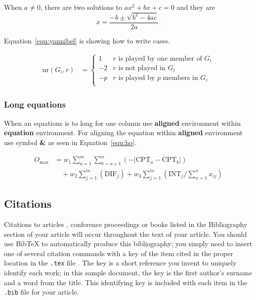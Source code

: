 \documentclass[article]{stucosrec}
\begin{document}
	When $a \ne 0$, there are two solutions to $ax^2 + bx + c = 0$ and they are $$x = \frac{-b \pm \sqrt{b^2-4ac}}{2a}.$$
	
	Equation~\ref{equ:yannibel} is showing how to write cases.
	
	\begin{equation}
		\begin{aligned} 
			\mathrm{nr}(G_i,r) & = \label{equ:yannibel}
			\begin{cases}
				1  & \text{$r$ is played by one member of $G_i$}\\
				-2 & \text{$r$ is not played in $G_i$} \\
				-p & \text{$r$ is played by $p$ members in $G_i$}\\
			\end{cases}
		\end{aligned}
	\end{equation}
	
	\subsubsection{Long equations}
	
	When an equations is to long for one column use \textbf{aligned} environment within \textbf{equation} environment.
	For aligning the equation within \textbf{aligned} environment use symbol \textbf{\&} as seen in Equation~\ref{equ:ho}.
	
	\begin{equation}
		\begin{aligned}
			O_{\max}& = w_1 \sum_{a=1}^{m} \sum_{b=a+1}^{n} (-\lvert\text{CPT}_a 
			-\text{CPT}_b\rvert)\\ 
			&\quad + w_2 \sum_{j=1}^{m} (\text{DIF}_j) + w_3 \sum_{j=1}^{m} 
			(\text{INT}_j/\sum_{x=1}^{n} x_{ij})
		\end{aligned}
		\label{equ:ho}
	\end{equation}
	
	\subsection{Citations}
	
	Citations to articles \cite{bowman:reasoning, clark:pct, braams:babel, herlihy:methodology}, conference proceedings \cite{clark:pct} or books \cite{salas:calculus, Lamport:LaTeX} listed
	in the Bibliography section of your article will occur throughout the text of your article.
	You should use BibTeX to automatically produce this bibliography; you simply need to insert one of several citation commands with a key of the item cited in the proper location in the \texttt{.tex} file \cite{Lamport:LaTeX}.
	The key is a short reference you invent to uniquely identify each work; in this sample document, the key is the first author's surname and a word from the title.
	This identifying key is included with each item in the \texttt{.bib} file for your article.
	
\end{document}
